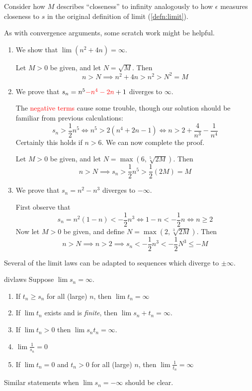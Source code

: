 Consider how $M$ describes ``closeness'' to infinity analogously to how $\epsilon$ measures closeness to $s$ in the original definition of limit (\ref{defn:limit}). 

\begin{examples}{}{}
	As with convergence arguments, some scratch work might be helpful.
	\begin{enumerate}
	  \item We show that $\lim (n^2+4n)=\infty$.\par
	  Let $M>0$ be given, and let $N=\sqrt M$. Then
		\[
			n>N\implies n^2+4n>n^2>N^2=M
		\]
	
		\item We prove that $s_n=n^5\textcolor{red}{-n^4-2n}+1$ diverges to $\infty$.\par
		The \textcolor{red}{negative terms} cause some trouble, though our solution should be familiar from previous calculations:  
		\[
			s_n>\frac 12n^5\iff n^5>2(n^4+2n-1)\iff n>2+\frac 4{n^3}-\frac 1{n^4}
		\]
		Certainly this holds if $n>6$. We can now complete the proof.\par
		Let $M>0$ be given, and let $N=\max(6,\sqrt[5]{2M})$. Then
		\[
			n>N\implies s_n>\frac 12n^5 >\frac 12(2M)=M
		\]
		
		\item We prove that $s_n=n^2-n^3$ diverges to $-\infty$.\par
		First observe that
		\[
			s_n=n^2(1-n)<-\frac 12n^3\iff 1-n<-\frac 12n\iff n\ge 2
		\]
		Now let $M>0$ be given,\footnotemark{} and define $N=\max(2,\sqrt[3]{2M})$. Then
		\[
			n>N\implies n>2\implies s_n<-\frac 12n^3<-\frac 12N^3\le -M
		\]
	\end{enumerate}
\end{examples}


\vspace{-15pt}


\goodbreak


Several of the limit laws can be adapted to sequences which diverge to $\pm\infty$.

\begin{thm}{}{divlaws}
	Suppose $\lim s_n=\infty$.
	\begin{enumerate}
		\item\label{thm:divlaws1} If $t_n\ge s_n$ for all (large) $n$, then $\lim t_n=\infty$
		\item If $\lim t_n$ exists and is \emph{finite}, then $\lim s_n+t_n=\infty$.
		\item If $\lim t_n>0$ then $\lim s_nt_n=\infty$.
		\item $\lim\frac 1{s_n}=0$
		\item If $\lim t_n=0$ and $t_n>0$ for all (large) $n$, then $\lim\frac 1{t_n}=\infty$
	\end{enumerate}
	Similar statements when $\lim s_n=-\infty$ should be clear.
\end{thm}

